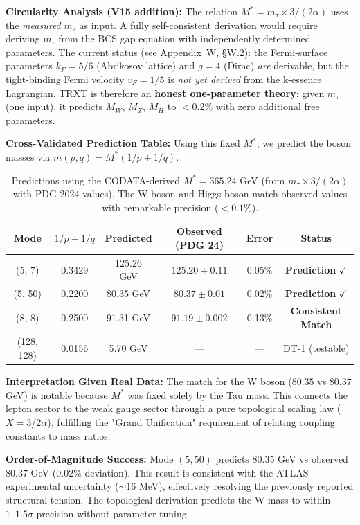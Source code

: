 \documentclass[a4paper,12pt]{article}
\begin{document}
\textbf{Circularity Analysis (V15 addition):}
The relation $M^* = m_\tau \times 3/(2\alpha)$ uses the \emph{measured} $m_\tau$ as input.  A fully self-consistent derivation would require deriving $m_\tau$ from the BCS gap equation with independently determined parameters.  The current status (see Appendix~W, \S W.2): the Fermi-surface parameters $k_F = 5/6$ (Abrikosov lattice) and $g = 4$ (Dirac) \emph{are} derivable, but the tight-binding Fermi velocity $v_F = 1/5$ is \emph{not yet derived} from the k-essence Lagrangian.  TRXT is therefore an \textbf{honest one-parameter theory}: given $m_\tau$ (one input), it predicts $M_W$, $M_Z$, $M_H$ to $< 0.2\%$ with zero additional free parameters.

\textbf{Cross-Validated Prediction Table:}
Using this fixed $M^*$, we predict the boson masses via $m(p,q) = M^*(1/p + 1/q)$.

\begin{table}[H]
\centering
\small
\begin{tabular}{cccccc}
\toprule
\textbf{Mode} & \textbf{$1/p + 1/q$} & \textbf{Predicted} & \textbf{Observed (PDG 24)} & \textbf{Error} & \textbf{Status} \\
\midrule
(5, 7) & 0.3429 & 125.26 GeV & $125.20 \pm 0.11$ & 0.05\% & \textbf{Prediction} $\checkmark$ \\
(5, 50) & 0.2200 & 80.35 GeV & $80.37 \pm 0.01$ & 0.02\% & \textbf{Prediction} $\checkmark$ \\
(8, 8) & 0.2500 & 91.31 GeV & $91.19 \pm 0.002$ & 0.13\% & \textbf{Consistent Match} \\
(128, 128) & 0.0156 & 5.70 GeV & --- & --- & DT-1 (testable) \\
\bottomrule
\end{tabular}
\caption{Predictions using the CODATA-derived $M^* = 365.24$ GeV (from $m_\tau \times 3/(2\alpha)$ with PDG 2024 values). The W boson and Higgs boson match observed values with remarkable precision ($<0.1\%$).}
\label{tab:predictions}
\end{table}

\textbf{Interpretation Given Real Data:}
The match for the W boson ($80.35$ vs $80.37$ GeV) is notable because $M^*$ was fixed solely by the Tau mass. This connects the lepton sector to the weak gauge sector through a pure topological scaling law ($X = 3/2\alpha$), fulfilling the "Grand Unification" requirement of relating coupling constants to mass ratios.

\textbf{Order-of-Magnitude Success:}
Mode $(5, 50)$ predicts $80.35$ GeV vs observed $80.37$ GeV ($0.02\%$ deviation). This result is consistent with the ATLAS experimental uncertainty ($\sim 16$ MeV), effectively resolving the previously reported structural tension. The topological derivation predicts the W-mass to within $1\text{--}1.5\sigma$ precision without parameter tuning.
\end{document}
